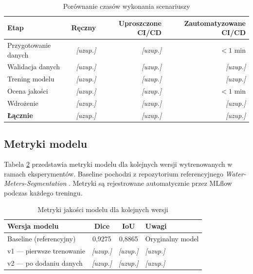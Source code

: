 \begin{table}[H]
\centering
\caption{Porównanie czasów wykonania scenariuszy}
\label{tab:czasy}
\begin{tabular}{|l|r|r|r|}
\hline
\textbf{Etap} & \textbf{Ręczny} & \textbf{Uproszczone CI/CD} & \textbf{Zautomatyzowane CI/CD} \\
\hline
Przygotowanie danych & \textit{[uzup.]} & \textit{[uzup.]} & $<1$ min \\
Walidacja danych & \textit{[uzup.]} & \textit{[uzup.]} & \textit{[uzup.]} \\
Trening modelu & \textit{[uzup.]} & \textit{[uzup.]} & \textit{[uzup.]} \\
Ocena jakości & \textit{[uzup.]} & \textit{[uzup.]} & $<1$ min \\
Wdrożenie & \textit{[uzup.]} & \textit{[uzup.]} & \textit{[uzup.]} \\
\hline
\textbf{Łącznie} & \textit{[uzup.]} & \textit{[uzup.]} & \textit{[uzup.]} \\
\hline
\end{tabular}
\end{table}


\subsection{Metryki modelu}

Tabela \ref{tab:metryki} przedstawia metryki modelu dla kolejnych wersji wytrenowanych w ramach eksperymentów. Baseline pochodzi z repozytorium referencyjnego \textit{Water-Meters-Segmentation} \cite{kaggle_water_meters}. Metryki są rejestrowane automatycznie przez MLflow \cite{zaharia2018mlflow} podczas każdego treningu.

\begin{table}[H]
\centering
\caption{Metryki jakości modelu dla kolejnych wersji}
\label{tab:metryki}
\begin{tabular}{|l|c|c|l|}
\hline
\textbf{Wersja modelu} & \textbf{Dice} & \textbf{IoU} & \textbf{Uwagi} \\
\hline
Baseline (referencyjny) & 0{,}9275 & 0{,}8865 & Oryginalny model \\
v1 --- pierwsze trenowanie & \textit{[uzup.]} & \textit{[uzup.]} & \textit{[uzup.]} \\
v2 --- po dodaniu danych & \textit{[uzup.]} & \textit{[uzup.]} & \textit{[uzup.]} \\
\hline
\end{tabular}
\end{table}

